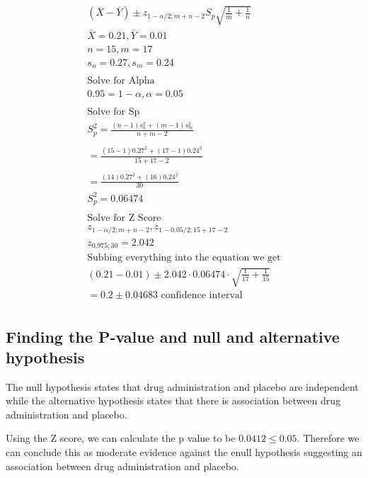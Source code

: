 \documentclass[oneside, a4paper]{article}
\begin{document}
\begin{equation*}
    \begin{split}
        (\overline{X} - \overline{Y}) \pm z_{1 - \alpha/2;m+n-2} S_p \sqrt{\frac{1}{m} + \frac{1}{n}} \\ 
        \overline{X} = 0.21, \overline{Y} = 0.01 \\
        n = 15, m = 17 \\
        s_n = 0.27, s_m = 0.24 \\\\
        \text{Solve for Alpha} \\
        0.95 = 1 - \alpha, \alpha = 0.05 \\\\
        \text{Solve for Sp} \\
        S_p^2 = \frac{(n - 1) s_n^2 + (m - 1)s_m^2}{n + m  - 2} \\\\
        = \frac{(15 - 1) 0.27^2 + (17- 1)0.24^2}{15 + 17  - 2} \\\\
        = \frac{(14) 0.27^2 + (16)0.24^2}{30} \\
        S_p^2 = 0.06474 \\\\
        \text{Solve for Z Score} \\
        z_{1 - \alpha/2;m+n-2}, z_{1 - 0.05/2;15+17-2} \\
        z_{0.975;30} = 2.042\\
        \text{Subbing everything into the equation we get} \\
        (0.21 - 0.01) \pm 2.042 \cdot 0.06474 \cdot \sqrt{\frac{1}{17} + \frac{1}{15}} \\
        = 0.2 \pm 0.04683 \text{ confidence interval}\\
    \end{split}
\end{equation*}

\subsection{Finding the P-value and null and alternative hypothesis}
The null hypothesis states that drug administration and placebo are independent while the alternative hypothesis states that there is association between drug administration and placebo.

Using the Z score, we can calculate the p value to be $0.0412 \leq 0.05$. Therefore we can conclude this as moderate evidence against the enull hypothesis suggesting an association between drug administration and placebo.
\end{document}
